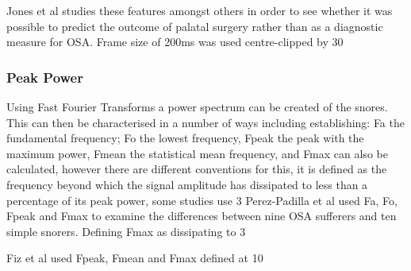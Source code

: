 Jones et al studies these features amongst others in order to see whether it was possible to predict the outcome of palatal surgery rather than as a diagnostic measure for OSA. Frame size of 200ms was used centre-clipped by 30%

\subsubsection{Peak Power}
Using Fast Fourier Transforms a power spectrum can be created of the snores. This can then be characterised in a number of ways including establishing: Fa the fundamental frequency; Fo the lowest frequency, Fpeak the peak with the maximum power, Fmean the statistical mean frequency, and Fmax can also be calculated, however there are different conventions for this, it is defined as the frequency beyond which the signal amplitude has dissipated to less than a percentage of its peak power, some studies use 3%
Perez-Padilla et al used Fa, Fo, Fpeak and Fmax to examine the differences between nine OSA sufferers and ten simple snorers. Defining Fmax as dissipating to 3%

Fiz et al used Fpeak, Fmean and Fmax defined at 10%

